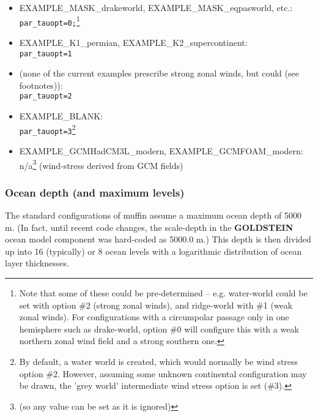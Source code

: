 \documentclass[11pt,fleqn]{book} %
\begin{document}
\vspace{1mm}
\begin{itemize}
\item \textsf{\footnotesize EXAMPLE\_MASK\_drakeworld}, \textsf{\footnotesize EXAMPLE\_MASK\_eqpasworld}, etc.:
\\\texttt{par\_tauopt=0;}\footnote{Note that some of these could be pre-determined -- e.g. water-world could be set with option \#2 (strong zonal winds), and ridge-world with \#1 (weak zonal winds). For configurations with a circumpolar passage only in one hemisphere such as drake-world, option \#0 will configure this with a weak northern zonal wind field and a strong southern one.}
\item \textsf{\footnotesize EXAMPLE\_K1\_permian}, \textsf{\footnotesize EXAMPLE\_K2\_supercontinent}:
\\\texttt{par\_tauopt=1}
\item (none of the current examples prescribe strong zonal winds, but could (see footnotes)):
\\\texttt{par\_tauopt=2}
\item \textsf{\footnotesize EXAMPLE\_BLANK}:
\\\texttt{par\_tauopt=3}\footnote{By default, a water world is created, which would normally be wind stress option \#2. However, assuming some unknown continental configuration may be drawn, the 'grey world' intermediate wind stress option is set (\#3).}
\item \textsf{\footnotesize EXAMPLE\_GCMHadCM3L\_modern}\normalsize, \textsf{\footnotesize EXAMPLE\_GCMFOAM\_modern}\normalsize:
\\n/a\footnote{(so any value can be set as it is ignored)} (wind-stress derived from GCM fields)
\end{itemize}
\vspace{1mm}


\subsubsection{Ocean depth (and maximum levels)}

The standard configurations of muffin assume a maximum ocean depth of 5000 m. (In fact, until recent code changes, the scale-depth in the \textbf{GOLDSTEIN} ocean model component was hard-coded as 5000.0 m.) This depth is then divided up into 16 (typically) or 8 ocean levels with a logarithmic distribution of ocean layer thicknesses.
\end{document}
